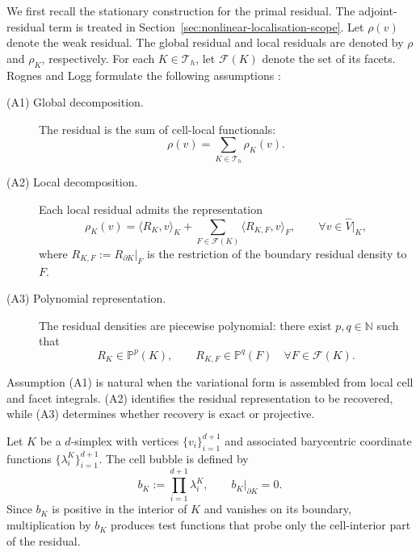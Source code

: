 We first recall the stationary construction for the primal residual. The adjoint-residual term is treated in Section~\ref{sec:nonlinear-localisation-scope}. Let \(\rho(v)\) denote the weak residual. The global residual and local residuals are denoted by \(\rho\) and \(\rho_K\), respectively. For each \(K\in\mathcal T_h\), let \(\mathcal F(K)\) denote the set of its facets. Rognes and Logg formulate the following assumptions \cite{Rognes_Logg_2013}:
\begin{description}
  \item[(A1) Global decomposition.] The residual is the sum of cell-local functionals:
  \begin{equation}
    \rho(v)
    =
    \sum_{K\in\mathcal T_h}\rho_K(v).
    \label{eq:stationary-global-decomposition}
  \end{equation}

  \item[(A2) Local decomposition.] Each local residual admits the representation
  \begin{equation}
    \rho_K(v)
    =
    \langle R_K,v\rangle_K
    +
    \sum_{F\in\mathcal F(K)}
    \langle R_{K,F},v\rangle_F,
    \qquad
    \forall v\in\widehat V|_K,
    \label{eq:stationary-residual-representation}
  \end{equation}
  where
  \(
    R_{K,F}:=R_{\partial K}|_F
  \)
  is the restriction of the boundary residual density to \(F\).

  \item[(A3) Polynomial representation.] The residual densities are piecewise polynomial: there exist \(p,q\in\mathbb N\) such that
\begin{equation}
  R_K\in\mathbb P^p(K),
  \qquad
  R_{K,F}\in\mathbb P^q(F)
  \quad
  \forall F\in\mathcal F(K).
  \label{eq:stationary-polynomial-representability}
\end{equation}
\end{description}
Assumption (A1) is natural when the variational form is assembled from local cell and facet integrals. (A2) identifies the residual representation to be recovered, while (A3) determines whether recovery is exact or projective\cite{Rognes_Logg_2013}.

Let \(K\) be a \(d\)-simplex with vertices \(\{v_i\}_{i=1}^{d+1}\) and associated barycentric coordinate functions \(\{\lambda_i^K\}_{i=1}^{d+1}\). The cell bubble is defined by
\begin{equation}
  b_K:=\prod_{i=1}^{d+1}\lambda_i^K,
  \qquad
  b_K|_{\partial K}=0.
  \label{eq:recovery-cell-bubble}
\end{equation}
Since \(b_K\) is positive in the interior of \(K\) and vanishes on its boundary, multiplication by \(b_K\) produces test functions that probe only the cell-interior part of the residual.

